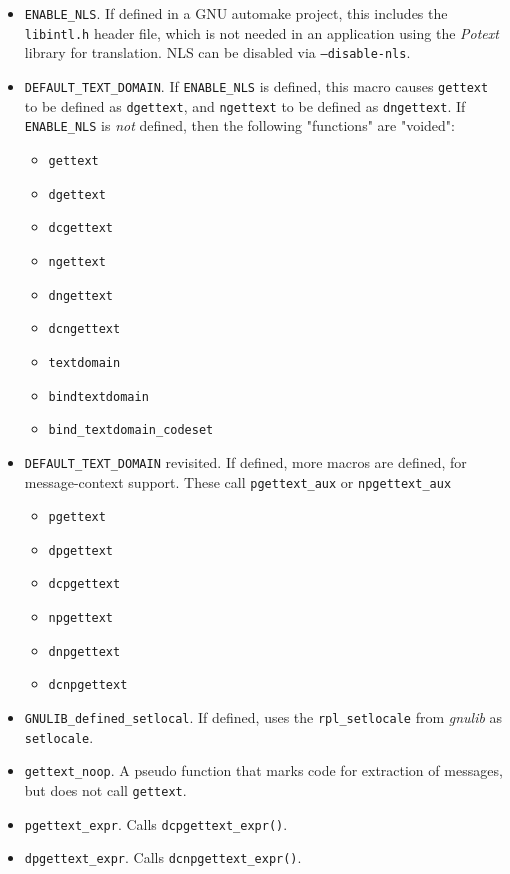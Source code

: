    \begin{itemize}
      \item \texttt{ENABLE\_NLS}.
         If defined in a GNU automake project, this includes the
         \texttt{libintl.h} header file, which is not needed in
         an application using the \textsl{Potext} library for translation.
         NLS can be disabled via \texttt{--disable-nls}.
      \item \texttt{DEFAULT\_TEXT\_DOMAIN}.
         If \texttt{ENABLE\_NLS} is defined, this macro causes
         \texttt{gettext} to be defined as \texttt{dgettext}, and
         \texttt{ngettext} to be defined as \texttt{dngettext}.
         If \texttt{ENABLE\_NLS} is \textsl{not} defined, then the following
         "functions" are "voided":
         \begin{itemize}
            \item \texttt{gettext}
            \item \texttt{dgettext}
            \item \texttt{dcgettext}
            \item \texttt{ngettext}
            \item \texttt{dngettext}
            \item \texttt{dcngettext}
            \item \texttt{textdomain}
            \item \texttt{bindtextdomain}
            \item \texttt{bind\_textdomain\_codeset}
         \end{itemize}
      \item \texttt{DEFAULT\_TEXT\_DOMAIN} revisited.
         If defined, more macros are defined, for message-context support.
         These call \texttt{pgettext\_aux}
         or \texttt{npgettext\_aux}
         \begin{itemize}
            \item \texttt{pgettext}
            \item \texttt{dpgettext}
            \item \texttt{dcpgettext}
            \item \texttt{npgettext}
            \item \texttt{dnpgettext}
            \item \texttt{dcnpgettext}
         \end{itemize}
      \item \texttt{GNULIB\_defined\_setlocal}.
         If defined, uses the \texttt{rpl\_setlocale} from \textsl{gnulib}
         as \texttt{setlocale}.
      \item \texttt{gettext\_noop}.
         A pseudo function that marks code for extraction of messages, but
         does not call \texttt{gettext}.
      \item \texttt{pgettext\_expr}. Calls \texttt{dcpgettext\_expr()}.
      \item \texttt{dpgettext\_expr}. Calls \texttt{dcnpgettext\_expr()}.
   \end{itemize}

